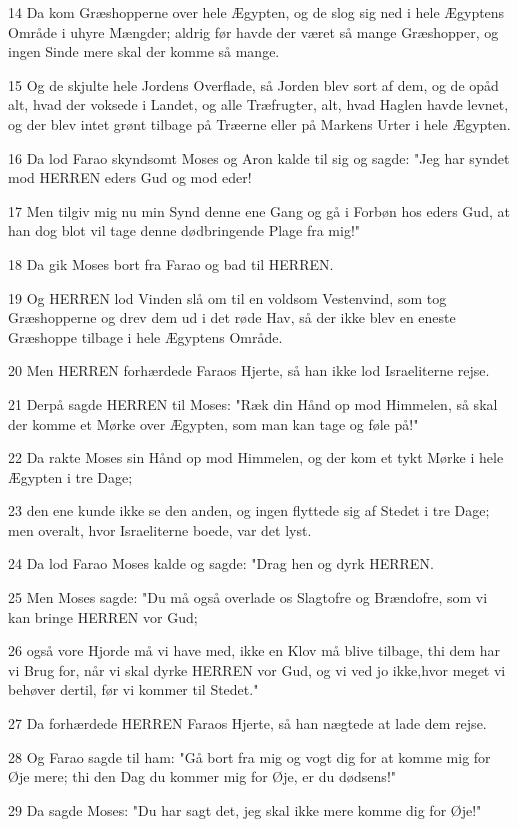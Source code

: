 \par 14 Da kom Græshopperne over hele Ægypten, og de slog sig ned i hele Ægyptens Område i uhyre Mængder; aldrig før havde der været så mange Græshopper, og ingen Sinde mere skal der komme så mange.
\par 15 Og de skjulte hele Jordens Overflade, så Jorden blev sort af dem, og de opåd alt, hvad der voksede i Landet, og alle Træfrugter, alt, hvad Haglen havde levnet, og der blev intet grønt tilbage på Træerne eller på Markens Urter i hele Ægypten.
\par 16 Da lod Farao skyndsomt Moses og Aron kalde til sig og sagde: "Jeg har syndet mod HERREN eders Gud og mod eder!
\par 17 Men tilgiv mig nu min Synd denne ene Gang og gå i Forbøn hos eders Gud, at han dog blot vil tage denne dødbringende Plage fra mig!"
\par 18 Da gik Moses bort fra Farao og bad til HERREN.
\par 19 Og HERREN lod Vinden slå om til en voldsom Vestenvind, som tog Græshopperne og drev dem ud i det røde Hav, så der ikke blev en eneste Græshoppe tilbage i hele Ægyptens Område.
\par 20 Men HERREN forhærdede Faraos Hjerte, så han ikke lod Israeliterne rejse.
\par 21 Derpå sagde HERREN til Moses: "Ræk din Hånd op mod Himmelen, så skal der komme et Mørke over Ægypten, som man kan tage og føle på!"
\par 22 Da rakte Moses sin Hånd op mod Himmelen, og der kom et tykt Mørke i hele Ægypten i tre Dage;
\par 23 den ene kunde ikke se den anden, og ingen flyttede sig af Stedet i tre Dage; men overalt, hvor Israeliterne boede, var det lyst.
\par 24 Da lod Farao Moses kalde og sagde: "Drag hen og dyrk HERREN.
\par 25 Men Moses sagde: "Du må også overlade os Slagtofre og Brændofre, som vi kan bringe HERREN vor Gud;
\par 26 også vore Hjorde må vi have med, ikke en Klov må blive tilbage, thi dem har vi Brug for, når vi skal dyrke HERREN vor Gud, og vi ved jo ikke,hvor meget vi behøver dertil, før vi kommer til Stedet."
\par 27 Da forhærdede HERREN Faraos Hjerte, så han nægtede at lade dem rejse.
\par 28 Og Farao sagde til ham: "Gå bort fra mig og vogt dig for at komme mig for Øje mere; thi den Dag du kommer mig for Øje, er du dødsens!"
\par 29 Da sagde Moses: "Du har sagt det, jeg skal ikke mere komme dig for Øje!"

